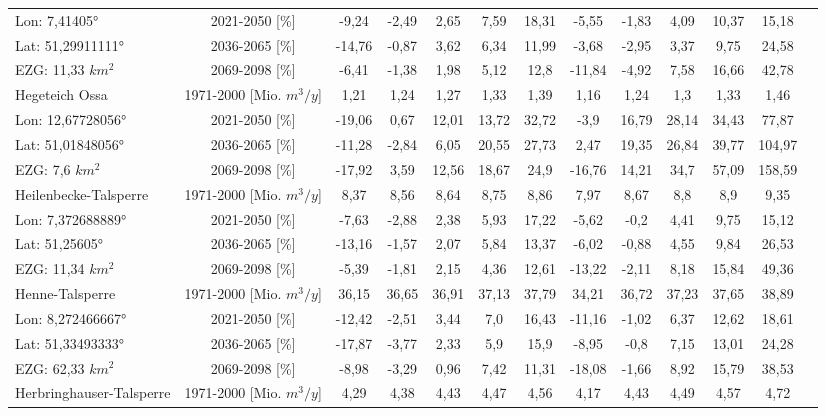 \begin{longtable}{@{\extracolsep{\fill}}lc|ccccc||cccccc}
\cline{2-13} 
Lon: 7,41405° & 2021-2050 [\%]  & -9,24 & -2,49 & 2,65 & 7,59 & 18,31 & -5,55 & -1,83 & 4,09 & 10,37 & 15,18 & \\ 
Lat: 51,29911111° & 2036-2065 [\%]  & -14,76 & -0,87 & 3,62 & 6,34 & 11,99 & -3,68 & -2,95 & 3,37 & 9,75 & 24,58 & \\ 
EZG: 11,33 $km^2$ & 2069-2098 [\%]  & -6,41 & -1,38 & 1,98 & 5,12 & 12,8 & -11,84 & -4,92 & 7,58 & 16,66 & 42,78 & \\ 
\hline 
Hegeteich Ossa & 1971-2000 [Mio. $m^3/y$]  & 1,21 & 1,24 & 1,27 & 1,33 & 1,39 & 1,16 & 1,24 & 1,3 & 1,33 & 1,46 & \\ 
\cline{2-13} 
Lon: 12,67728056° & 2021-2050 [\%]  & -19,06 & 0,67 & 12,01 & 13,72 & 32,72 & -3,9 & 16,79 & 28,14 & 34,43 & 77,87 & \\ 
Lat: 51,01848056° & 2036-2065 [\%]  & -11,28 & -2,84 & 6,05 & 20,55 & 27,73 & 2,47 & 19,35 & 26,84 & 39,77 & 104,97 & \\ 
EZG: 7,6 $km^2$ & 2069-2098 [\%]  & -17,92 & 3,59 & 12,56 & 18,67 & 24,9 & -16,76 & 14,21 & 34,7 & 57,09 & 158,59 & \\ 
\hline 
Heilenbecke-Talsperre & 1971-2000 [Mio. $m^3/y$]  & 8,37 & 8,56 & 8,64 & 8,75 & 8,86 & 7,97 & 8,67 & 8,8 & 8,9 & 9,35 & \\ 
\cline{2-13} 
Lon: 7,372688889° & 2021-2050 [\%]  & -7,63 & -2,88 & 2,38 & 5,93 & 17,22 & -5,62 & -0,2 & 4,41 & 9,75 & 15,12 & \\ 
Lat: 51,25605° & 2036-2065 [\%]  & -13,16 & -1,57 & 2,07 & 5,84 & 13,37 & -6,02 & -0,88 & 4,55 & 9,84 & 26,53 & \\ 
EZG: 11,34 $km^2$ & 2069-2098 [\%]  & -5,39 & -1,81 & 2,15 & 4,36 & 12,61 & -13,22 & -2,11 & 8,18 & 15,84 & 49,36 & \\ 
\hline 
Henne-Talsperre & 1971-2000 [Mio. $m^3/y$]  & 36,15 & 36,65 & 36,91 & 37,13 & 37,79 & 34,21 & 36,72 & 37,23 & 37,65 & 38,89 & \\ 
\cline{2-13} 
Lon: 8,272466667° & 2021-2050 [\%]  & -12,42 & -2,51 & 3,44 & 7,0 & 16,43 & -11,16 & -1,02 & 6,37 & 12,62 & 18,61 & \\ 
Lat: 51,33493333° & 2036-2065 [\%]  & -17,87 & -3,77 & 2,33 & 5,9 & 15,9 & -8,95 & -0,8 & 7,15 & 13,01 & 24,28 & \\ 
EZG: 62,33 $km^2$ & 2069-2098 [\%]  & -8,98 & -3,29 & 0,96 & 7,42 & 11,31 & -18,08 & -1,66 & 8,92 & 15,79 & 38,53 & \\ 
\hline 
Herbringhauser-Talsperre & 1971-2000 [Mio. $m^3/y$]  & 4,29 & 4,38 & 4,43 & 4,47 & 4,56 & 4,17 & 4,43 & 4,49 & 4,57 & 4,72 & \\ 

\end{longtable}
